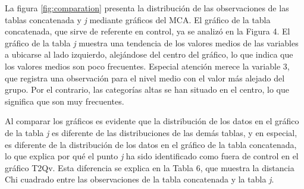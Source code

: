 \documentclass[mathematics,article,submit,moreauthors,pdftex]{mdpi}
\begin{document}
La figura \ref{fig:comparation} presenta la distribución de las
observaciones de las tablas concatenada y \emph{j} mediante gráficos del
MCA. El gráfico de la tabla concatenada, que sirve de referente en
control, ya se analizó en la Figura 4. El gráfico de la tabla \emph{j}
muestra una tendencia de los valores medios de las variables a ubicarse
al lado izquierdo, alejándose del centro del gráfico, lo que indica que
los valores medios son poco frecuentes. Especial atención merece la
variable 3, que registra una observación para el nivel medio con el
valor más alejado del grupo. Por el contrario, las categorías altas se
han situado en el centro, lo que significa que son muy frecuentes.

Al comparar los gráficos es evidente que la distribución de los datos en
el gráfico de la tabla \emph{j} es diferente de las distribuciones de
las demás tablas, y en especial, es diferente de la distribución de los
datos en el gráfico de la tabla concatenada, lo que explica por qué el
punto \emph{j} ha sido identificado como fuera de control en el gráfico
T2Qv. Esta diferencia se explica en la Tabla 6, que muestra la distancia
Chi cuadrado entre las observaciones de la tabla concatenada y la tabla
\emph{j}.
\end{document}
